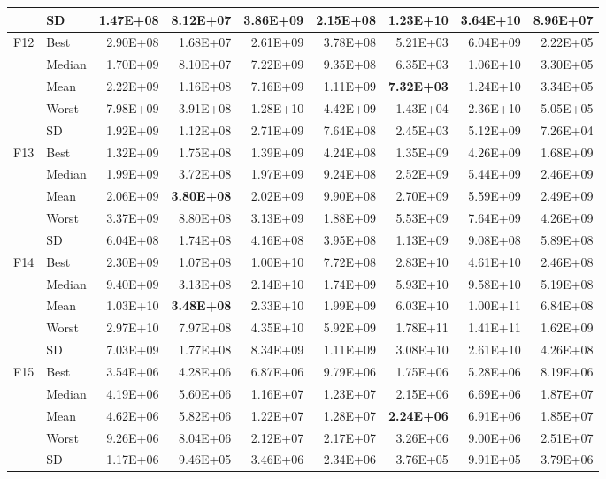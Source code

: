 \documentclass[10pt,a4paper]{article}
\newcommand{\bestval}[1]{\textbf{#1}}
\begin{document}
\begin{table}[p]
\begin{tabular}{llrrrrrrr}
 & SD & 1.47E+08 & 8.12E+07 & 3.86E+09 & 2.15E+08 & 1.23E+10 & 3.64E+10 & 8.96E+07 \\
\midrule
F12 & Best & 2.90E+08 & 1.68E+07 & 2.61E+09 & 3.78E+08 & 5.21E+03 & 6.04E+09 & 2.22E+05 \\
 & Median & 1.70E+09 & 8.10E+07 & 7.22E+09 & 9.35E+08 & 6.35E+03 & 1.06E+10 & 3.30E+05 \\
 & Mean & 2.22E+09 & 1.16E+08 & 7.16E+09 & 1.11E+09 & \bestval{7.32E+03} & 1.24E+10 & 3.34E+05 \\
 & Worst & 7.98E+09 & 3.91E+08 & 1.28E+10 & 4.42E+09 & 1.43E+04 & 2.36E+10 & 5.05E+05 \\
 & SD & 1.92E+09 & 1.12E+08 & 2.71E+09 & 7.64E+08 & 2.45E+03 & 5.12E+09 & 7.26E+04 \\
\midrule
F13 & Best & 1.32E+09 & 1.75E+08 & 1.39E+09 & 4.24E+08 & 1.35E+09 & 4.26E+09 & 1.68E+09 \\
 & Median & 1.99E+09 & 3.72E+08 & 1.97E+09 & 9.24E+08 & 2.52E+09 & 5.44E+09 & 2.46E+09 \\
 & Mean & 2.06E+09 & \bestval{3.80E+08} & 2.02E+09 & 9.90E+08 & 2.70E+09 & 5.59E+09 & 2.49E+09 \\
 & Worst & 3.37E+09 & 8.80E+08 & 3.13E+09 & 1.88E+09 & 5.53E+09 & 7.64E+09 & 4.26E+09 \\
 & SD & 6.04E+08 & 1.74E+08 & 4.16E+08 & 3.95E+08 & 1.13E+09 & 9.08E+08 & 5.89E+08 \\
\midrule
F14 & Best & 2.30E+09 & 1.07E+08 & 1.00E+10 & 7.72E+08 & 2.83E+10 & 4.61E+10 & 2.46E+08 \\
 & Median & 9.40E+09 & 3.13E+08 & 2.14E+10 & 1.74E+09 & 5.93E+10 & 9.58E+10 & 5.19E+08 \\
 & Mean & 1.03E+10 & \bestval{3.48E+08} & 2.33E+10 & 1.99E+09 & 6.03E+10 & 1.00E+11 & 6.84E+08 \\
 & Worst & 2.97E+10 & 7.97E+08 & 4.35E+10 & 5.92E+09 & 1.78E+11 & 1.41E+11 & 1.62E+09 \\
 & SD & 7.03E+09 & 1.77E+08 & 8.34E+09 & 1.11E+09 & 3.08E+10 & 2.61E+10 & 4.26E+08 \\
\midrule
F15 & Best & 3.54E+06 & 4.28E+06 & 6.87E+06 & 9.79E+06 & 1.75E+06 & 5.28E+06 & 8.19E+06 \\
 & Median & 4.19E+06 & 5.60E+06 & 1.16E+07 & 1.23E+07 & 2.15E+06 & 6.69E+06 & 1.87E+07 \\
 & Mean & 4.62E+06 & 5.82E+06 & 1.22E+07 & 1.28E+07 & \bestval{2.24E+06} & 6.91E+06 & 1.85E+07 \\
 & Worst & 9.26E+06 & 8.04E+06 & 2.12E+07 & 2.17E+07 & 3.26E+06 & 9.00E+06 & 2.51E+07 \\
 & SD & 1.17E+06 & 9.46E+05 & 3.46E+06 & 2.34E+06 & 3.76E+05 & 9.91E+05 & 3.79E+06 \\
\bottomrule
\end{tabular}
\end{table}
\end{document}
